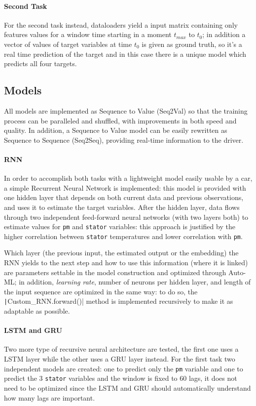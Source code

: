 \paragraph{Second Task}
For the second task instead, dataloaders yield a input matrix containing only features values for a window time starting in a moment $t_{max}$ to $t_0$; in addition a vector of values of target variables at time $t_0$ is given as ground truth, so it's a real time prediction of the target and in this case there is a unique model which predicts all four targets.

\subsection{Models}
All models are implemented as Sequence to Value (Seq2Val) so that the training process can be paralleled and shuffled, with improvements in both speed and quality.
In addition, a Sequence to Value model can be easily rewritten as Sequence to Sequence (Seq2Seq), providing real-time information to the driver.

\paragraph{RNN}
In order to accomplish both tasks with a lightweight model easily usable by a car, a simple Recurrent Neural Network is implemented: this model is provided with one hidden layer that depends on both current data and previous observations, and uses it to estimate the target variables.
After the hidden layer, data flows through two independent feed-forward neural networks (with two layers both) to estimate values for \verb|pm| and \verb|stator| variables: this approach is justified by the higher correlation between \verb|stator| temperatures and lower correlation with \verb|pm|.

Which layer (the previous input, the estimated output or the embedding) the RNN yields to the next step and how to use this information (where it is linked) are parameters settable in the model construction and optimized through Auto-ML; in addition, \textit{learning rate}, number of neurons per hidden layer, and length of the input sequence are optimized in the same way: to do so, the \texttt|Custom_RNN.forward()| method is implemented recursively to make it as adaptable as possible.

\paragraph{LSTM and GRU}
Two more type of recursive neural architecture are tested, the first one uses a LSTM layer while the other uses a GRU layer instead.
For the first task two independent models are created: one to predict only the \verb|pm| variable and one to predict the 3 \verb|stator| variables and the window is fixed to 60 lags, it does not need to be optimized since the LSTM and GRU should automatically understand how many lags are important.

